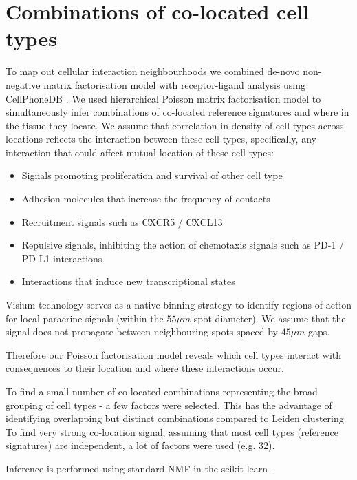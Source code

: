 \documentclass[11pt,a4paper]{article}
\begin{document}
\section{Combinations of co-located cell types} \label{cell_neighbourhoods}

To map out cellular interaction neighbourhoods we combined de-novo non-negative matrix factorisation model with receptor-ligand analysis using CellPhoneDB \cite{vento-tormo_single-cell_2018}. We used hierarchical Poisson matrix factorisation model to simultaneously infer combinations of co-located reference signatures and where in the tissue they locate. We assume that correlation in density of cell types across locations reflects the interaction between these cell types, specifically, any interaction that could affect mutual location of these cell types:
\begin{itemize}
    \item Signals promoting proliferation and survival of other cell type
    \item Adhesion molecules that increase the frequency of contacts 
    \item Recruitment signals such as CXCR5 / CXCL13 \cite{van_de_pavert_chemokine_2009}
    \item Repulsive signals, inhibiting the action of chemotaxis signals such as PD-1 / PD-L1 interactions \cite{shi_pd-1_2018}
    \item Interactions that induce new transcriptional states 
\end{itemize}

Visium technology serves as a native binning strategy to identify regions of action for local paracrine signals (within the $55\mu m$ spot diameter). We assume that the signal does not propagate between neighbouring spots spaced by $45\mu m$ gaps.

Therefore our Poisson factorisation model reveals which cell types interact with consequences to their location and where these interactions occur. 

To find a small number of co-located combinations representing the broad grouping of cell types - a few factors were selected. This has the advantage of identifying overlapping but distinct combinations compared to Leiden clustering.
To find very strong co-location signal, assuming that most cell types (reference signatures) are independent, a lot of factors were used (e.g. 32).

Inference is performed using standard NMF in the scikit-learn \cite{scikit-learn}.
\end{document}
